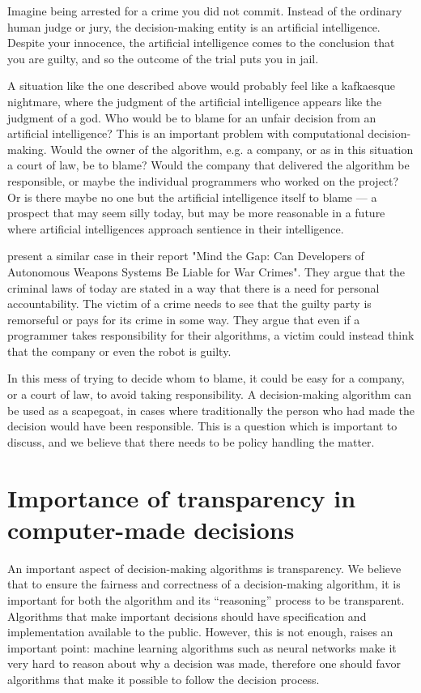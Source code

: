 \documentclass[11pt]{article}
\begin{document}
Imagine being arrested for a crime you did not commit.
Instead of the ordinary human judge or jury, the decision-making 
entity is an artificial intelligence. Despite your innocence, the 
artificial intelligence comes to the conclusion that you are guilty, 
and so the outcome of the trial puts you in jail.

A situation like the one described above would probably feel like a kafkaesque nightmare,
where the judgment of the artificial intelligence appears like the judgment of a god. Who would be to
blame for an unfair decision from an artificial intelligence? This is an important problem with
computational decision-making. Would the owner of the algorithm, e.g. a company,
or as in this situation a court of law, be to blame? Would the company that
delivered the algorithm be responsible, or maybe the individual programmers who
worked on the project? Or is there maybe no one but the artificial intelligence itself to blame --- a
prospect that may seem silly today, but may be more reasonable in a future where
artificial intelligences approach sentience in their intelligence.

\citeauthor{mcfarland2014mind} present a similar case in their report 
"Mind the Gap: Can Developers of Autonomous Weapons Systems Be Liable for War Crimes". 
They argue that the criminal laws of today are stated in a way that there is a need for 
personal accountability. The victim of a crime needs to see that the guilty party is remorseful or pays
for its crime in some way. They argue that even if a programmer takes responsibility for their algorithms, 
a victim could instead think that the company or even the robot is guilty.

In this mess of trying to decide
whom to blame, it could be easy for a company, or a court of law, to avoid
taking responsibility. A decision-making algorithm can be used as a scapegoat,
in cases where traditionally the person who had made the decision would have
been responsible. This is a question which is important to discuss, and we
believe that there needs to be policy handling the matter.


\section{Importance of transparency in computer-made decisions}

An important aspect of decision-making algorithms is transparency. We
believe that to ensure the fairness and correctness of a
decision-making algorithm, it is important for both the algorithm and
its ``reasoning'' process to be transparent. Algorithms that make
important decisions should have specification and implementation
available to the public. However, this is not enough,
 raises an important point: machine learning
algorithms such as neural networks make it very hard to reason about
why a decision was made, therefore one should favor algorithms that
make it possible to follow the decision process.
\end{document}
